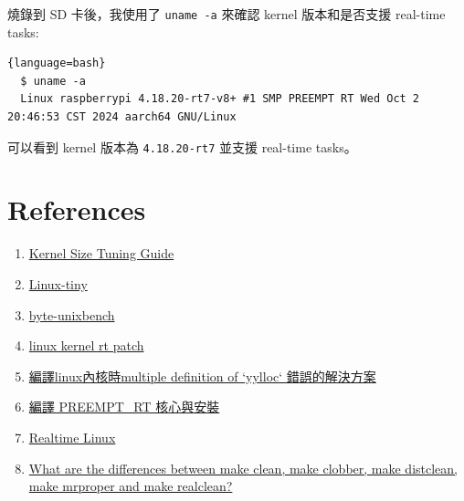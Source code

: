 \documentclass[a4paper, oneside, final, 12pt]{scrartcl} %
\begin{document}
燒錄到 SD 卡後，我使用了 \lstinline{uname -a} 來確認 kernel 版本和是否支援 real-time tasks:

\begin{lstlisting}[firstnumber=1]{language=bash}
  $ uname -a
  Linux raspberrypi 4.18.20-rt7-v8+ #1 SMP PREEMPT RT Wed Oct 2 20:46:53 CST 2024 aarch64 GNU/Linux
\end{lstlisting}

可以看到 kernel 版本為 \lstinline{4.18.20-rt7} 並支援 real-time tasks。

\endgroup

\section{References}

\begin{enumerate}
  \item \href{https://elinux.org/Kernel_Size_Tuning_Guide}{Kernel Size Tuning Guide}
  \item \href{https://elinux.org/Linux_Tiny}{Linux-tiny}
  \item \href{https://github.com/kdlucas/byte-unixbench}{byte-unixbench}
  \item \href{https://mirrors.edge.kernel.org/pub/linux/kernel/projects/rt/}{linux kernel rt patch}
  \item \href{https://blog.csdn.net/u011781073/article/details/123773085}{編譯linux內核時multiple definition of `yylloc` 錯誤的解決方案}
  \item \href{https://hackmd.io/@oscarshiang/peempt_rt_raspi}{編譯 PREEMPT\_RT 核心與安裝}
  \item \href{https://medium.com/@patdhlk/realtime-linux-e97628b51d5d}{Realtime Linux}
  \item \href{https://stackoverflow.com/questions/51837675/what-are-the-differences-between-make-clean-make-clobber-make-distclean-make}{What are the differences between make clean, make clobber, make distclean, make mrproper and make realclean?}
\end{enumerate}
\end{document}
